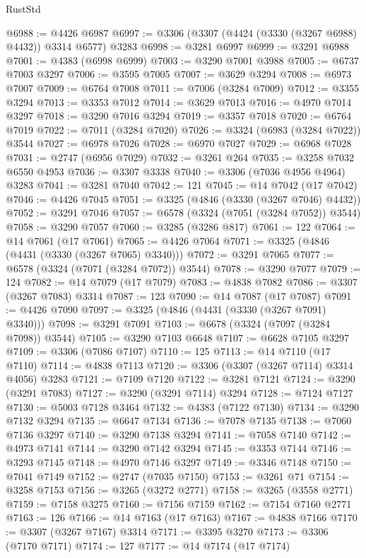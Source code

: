 \begin{lexlean}{RustStd}
\begin{coremodule}
@6988 := @4426 @6987
@6997 := @3306 (@3307 (@4424 (@3330 (@3267 @6988) @4432)) @3314 @6577) @3283
@6998 := @3281 @6997
@6999 := @3291 @6988
@7001 := @4383 (@6998 @6999)
@7003 := @3290 @7001 @3988
@7005 := @6737 @7003 @3297
@7006 := @3595 @7005
@7007 := @3629 @3294
@7008 := @6973 @7007
@7009 := @6764 @7008
@7011 := @7006 (@3284 @7009)
@7012 := @3355 @3294
@7013 := @3353 @7012
@7014 := @3629 @7013
@7016 := @4970 @7014 @3297
@7018 := @3290 @7016 @3294
@7019 := @3357 @7018
@7020 := @6764 @7019
@7022 := @7011 (@3284 @7020)
@7026 := @3324 (@6983 (@3284 @7022)) @3544
@7027 := @6978 @7026
@7028 := @6970 @7027
@7029 := @6968 @7028
@7031 := @2747 (@6956 @7029)
@7032 := @3261 @264
@7035 := @3258 @7032 @6550 @4953
@7036 := @3307 @3338
@7040 := @3306 (@7036 @4956 @4964) @3283
@7041 := @3281 @7040
@7042 := 121
@7045 := @14 @7042 (@17 @7042)
@7046 := @4426 @7045
@7051 := @3325 (@4846 (@3330 (@3267 @7046) @4432))
@7052 := @3291 @7046
@7057 := @6578 (@3324 (@7051 (@3284 @7052)) @3544)
@7058 := @3290 @7057
@7060 := @3285 (@3286 @817)
@7061 := 122
@7064 := @14 @7061 (@17 @7061)
@7065 := @4426 @7064
@7071 := @3325 (@4846 (@4431 (@3330 (@3267 @7065) @3340)))
@7072 := @3291 @7065
@7077 := @6578 (@3324 (@7071 (@3284 @7072)) @3544)
@7078 := @3290 @7077
@7079 := 124
@7082 := @14 @7079 (@17 @7079)
@7083 := @4838 @7082
@7086 := @3307 (@3267 @7083) @3314
@7087 := 123
@7090 := @14 @7087 (@17 @7087)
@7091 := @4426 @7090
@7097 := @3325 (@4846 (@4431 (@3330 (@3267 @7091) @3340)))
@7098 := @3291 @7091
@7103 := @6678 (@3324 (@7097 (@3284 @7098)) @3544)
@7105 := @3290 @7103 @6648
@7107 := @6628 @7105 @3297
@7109 := @3306 (@7086 @7107)
@7110 := 125
@7113 := @14 @7110 (@17 @7110)
@7114 := @4838 @7113
@7120 := @3306 (@3307 (@3267 @7114) @3314 @4056) @3283
@7121 := @7109 @7120
@7122 := @3281 @7121
@7124 := @3290 (@3291 @7083)
@7127 := @3290 (@3291 @7114) @3294
@7128 := @7124 @7127
@7130 := @5003 @7128 @3464
@7132 := @4383 (@7122 @7130)
@7134 := @3290 @7132 @3294
@7135 := @6647 @7134
@7136 := @7078 @7135
@7138 := @7060 @7136 @3297
@7140 := @3290 @7138 @3294
@7141 := @7058 @7140
@7142 := @4973 @7141
@7144 := @3290 @7142 @3294
@7145 := @3353 @7144
@7146 := @3293 @7145
@7148 := @4970 @7146 @3297
@7149 := @3346 @7148
@7150 := @7041 @7149
@7152 := @2747 (@7035 @7150)
@7153 := @3261 @71
@7154 := @3258 @7153
@7156 := @3265 (@3272 @2771)
@7158 := @3265 (@3558 @2771)
@7159 := @7158 @3275
@7160 := @7156 @7159
@7162 := @7154 @7160 @2771
@7163 := 126
@7166 := @14 @7163 (@17 @7163)
@7167 := @4838 @7166
@7170 := @3307 (@3267 @7167) @3314
@7171 := @3395 @3270
@7173 := @3306 (@7170 @7171)
@7174 := 127
@7177 := @14 @7174 (@17 @7174)

\end{coremodule}
\end{lexlean}
